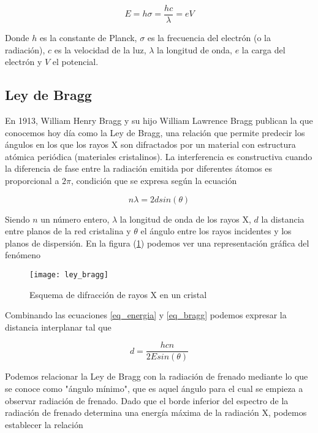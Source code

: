 \begin{equation}
	E = h \sigma = \frac{hc}{\lambda} = eV \label{eq_energia}
\end{equation}

Donde $h$ es la constante de Planck, $\sigma$ es la frecuencia del electrón (o la radiación), $c$ es la velocidad de la luz, $\lambda$ la longitud de onda, $e$ la carga del electrón y $V$ el potencial.

\subsection{Ley de Bragg}

En 1913, William Henry Bragg y su hijo William Lawrence Bragg publican la que conocemos hoy día como la Ley de Bragg, una relación que permite predecir los ángulos en los que los rayos X son difractados por un material con estructura atómica periódica (materiales cristalinos). La interferencia es constructiva cuando la diferencia de fase entre la radiación emitida por diferentes átomos es proporcional a $2\pi$, condición que se expresa según la ecuación

\begin{equation}
	n \lambda = 2d sin(\theta) \label{eq_bragg}
\end{equation}

Siendo $n$ un número entero, $\lambda$ la longitud de onda de los rayos X, $d$ la distancia entre planos de la red cristalina y $\theta$ el ángulo entre los rayos incidentes y los planos de dispersión. En la figura (\ref{figure_ley_bragg}) podemos ver una representación gráfica del fenómeno

\begin{figure}[t]
	\texttt{[image: ley\_bragg]}
	\caption{Esquema de difracción de rayos X en un cristal}
	\label{figure_ley_bragg}
\end{figure}

Combinando las ecuaciones \eqref{eq_energia} y \eqref{eq_bragg} podemos expresar la distancia interplanar tal que

\begin{equation}
	d = \frac{hcn}{2Esin(\theta)} \label{eq_distancia}
\end{equation}

Podemos relacionar la Ley de Bragg con la radiación de frenado mediante lo que se conoce como "ángulo mínimo", que es aquel ángulo para el cual se empieza a observar radiación de frenado. Dado que el borde inferior del espectro de la radiación de frenado determina una energía máxima de la radiación X, podemos establecer la relación

